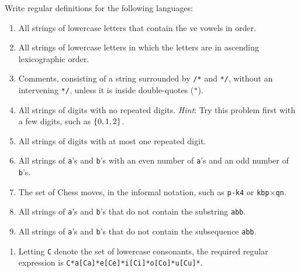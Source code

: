 \begin{exercise}\label{ex:030305}
    Write regular definitions for the following languages:
    \begin{enumerate}[label=\alph*)]
        \item All strings of lowercase letters that contain the ve vowels in 
        order.
        \item All strings of lowercase letters in which the letters are in 
        ascending lexicographic order.
        \item Comments, consisting of a string surrounded by \texttt{/*} and 
        \texttt{*/}, without an intervening \texttt{*/}, unless it is inside 
        double-quotes (\texttt{"}).
        \item All strings of digits with no repeated digits. \emph{Hint}: Try 
        this problem first with a few digits, such as $\left\{ 0,1,2 \right\}$.
        \item All strings of digits with at most one repeated digit.
        \item All strings of \texttt{a}'s and \texttt{b}'s with an even number 
        of \texttt{a}'s and an odd number of \texttt{b}'s. 
        \item The set of Chess moves, in the informal notation, such as
        \texttt{{p-k4}} or \texttt{kbp}$\times$\texttt{qn}.
        \item All strings of \texttt{a}'s and \texttt{b}'s that do not contain
        the substring \texttt{abb}.
        \item All strings of \texttt{a}'s and \texttt{b}'s that do not contain
        the subsequence \texttt{abb}.
    \end{enumerate}
\end{exercise}
\begin{solution}\label{sol:030305}
    \begin{enumerate}[label=\alph*)]
        \item Letting \texttt{C} denote the set of lowercase consonants, the 
        required regular expression is \texttt{C*a\texttt[Ca]*e[Ce]*i[Ci]*o[Co]*u[Cu]*}.
    \end{enumerate}
\end{solution}